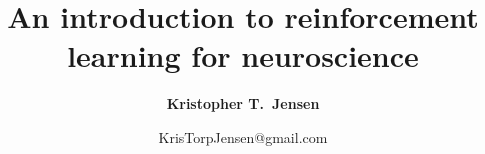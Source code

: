 
\usepackage{graphicx} %
\usepackage[compress]{natbib}
\usepackage[resetlabels]{multibib}

\usepackage{url}            %
\usepackage{float}
\usepackage[table]{xcolor}

\usepackage{caption}
\usepackage{subcaption}
\usepackage{amsmath,amssymb,bm}
\usepackage{multicol}
\usepackage{lineno}
\usepackage{authblk}

\usepackage[colorlinks=true, linkcolor=dblue, citecolor=dred, urlcolor=dblue]{hyperref}       %

\usepackage[nameinlink]{cleveref}
\usepackage[margin=1in]{geometry}
\renewcommand\b\bm
\setlength{\parindent}{0pt}
\setlength{\parskip  }{5.5pt}
\setlength\columnsep{30pt}
\setlength\footnotesep{15pt}

\title{An introduction to reinforcement learning for neuroscience \vspace{0.5em}}

\author[1,2]{\normalsize \bfseries Kristopher T.\ Jensen}
\date{\vspace*{-1.5em}
\normalsize KrisTorpJensen@gmail.com
}
